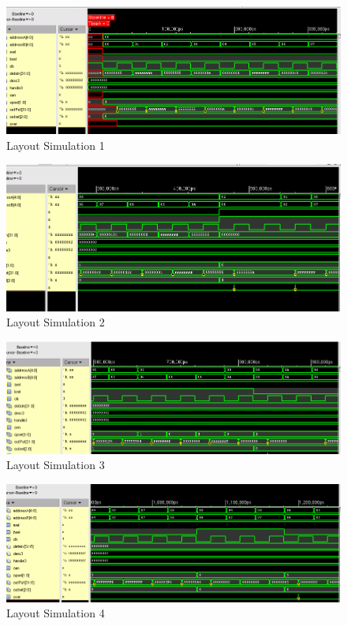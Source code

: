 \documentclass[12pt]{article}
\begin{document}
\begin{figure}[H]
\centering
\includegraphics[width=\linewidth]{../case2/enc1}
\caption{Layout Simulation 1}
\label{fig:enc1}
\end{figure}
\begin{figure}[H]
\centering
\includegraphics[width=\linewidth]{../case2/enc2}
\caption{Layout Simulation 2}
\label{fig:enc2}
\end{figure}
\begin{figure}[H]
\centering
\includegraphics[width=\linewidth]{../case2/enc3}
\caption{Layout Simulation 3}
\label{fig:enc3}
\end{figure}
\begin{figure}[H]
\centering
\includegraphics[width=\linewidth]{../case2/enc4}
\caption{Layout Simulation 4}
\label{fig:enc4}
\end{figure}
\end{document}
